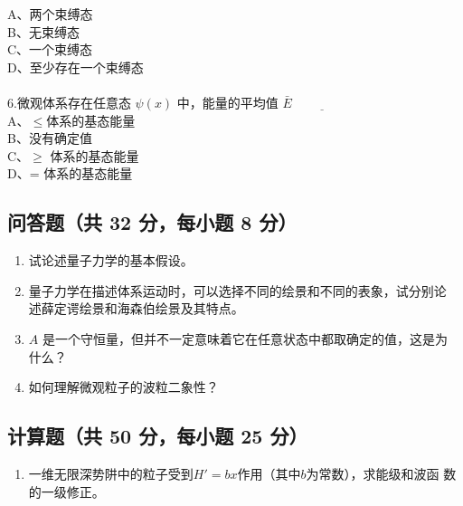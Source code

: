     A、两个束缚态\\
    B、无束缚态\\
    C、一个束缚态\\
    D、至少存在一个束缚态\\\\
6.微观体系存在任意态 $\psi(x)$ 中，能量的平均值 $\bar{E}\underline{\hspace{2cm}}$\\
    A、$\leq$体系的基态能量\\
    B、没有确定值\\
    C、$\geq$ 体系的基态能量 \\
    D、= 体系的基态能量\\
\subsection{问答题（共 32 分，每小题 8 分）}
\begin{enumerate}
\item 试论述量子力学的基本假设。
\item 量子力学在描述体系运动时，可以选择不同的绘景和不同的表象，试分别论
述薛定谔绘景和海森伯绘景及其特点。
\item $A$ 是一个守恒量，但并不一定意味着它在任意状态中都取确定的值，这是为
什么？
\item 如何理解微观粒子的波粒二象性？
\end{enumerate}
\subsection{计算题（共 50 分，每小题 25 分）}
\begin{enumerate}
\item 一维无限深势阱中的粒子受到$H' = bx$作用（其中$b$为常数），求能级和波函
数的一级修正。
\end{enumerate}

